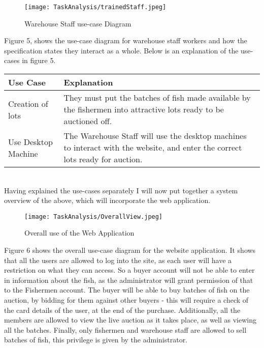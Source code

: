 \documentclass{article}
\begin{document}
\begin{figure}[htp]
\centering
\texttt{[image: TaskAnalysis/trainedStaff.jpeg]}
\caption{Warehouse Staff use-case Diagram}
\label{}
\end{figure}
\noindent Figure 5, shows the use-case diagram for warehouse staff workers and how the specification states they interact as a whole. Below is an explanation of the use-cases in figure 5.
\begin{center}
\begin{tabular}{p{6cm}|p{6cm}}
	\hline
	\hline Use Case & Explanation\\ \hline
	Creation of lots & They must put the batches of fish made available by the fishermen into attractive lots ready to be auctioned off.\\
	\hline
	Use Desktop Machine & The  Warehouse Staff will use the desktop machines to interact with the website, and enter the correct lots ready for auction.  \\
	\hline
	\hline
\end{tabular}
\end{center}
~\\

\noindent Having explained the use-cases separately I will now put together a system overview of the above, which will incorporate the web application. 
\begin{figure}[htp]
\centering
\texttt{[image: TaskAnalysis/OverallView.jpeg]}
\caption{Overall use of the Web Application}
\label{}
\end{figure}

\noindent Figure 6 shows the overall use-case diagram for the website application. It shows that all the users are allowed to log into the site, as each user will have a restriction on what they can access. So a buyer account will not be able to enter in information about the fish, as the administrator will grant permission of that to the Fishermen account. The buyer will be able to buy batches of fish on the auction, by bidding for them against other buyers - this will require a check of the card details of the user, at the end of the purchase. Additionally, all the members are allowed to view the live auction as it takes place, as well as viewing all the batches. Finally, only fishermen and warehouse staff are allowed to sell batches of fish, this privilege  is given by the administrator.  
\end{document}
